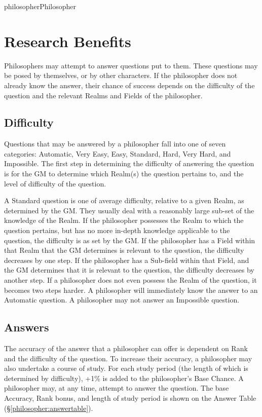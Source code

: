 \begin{Skill}[2.0]{philosopher}{Philosopher}
\section{Research Benefits}

Philosophers may attempt to answer questions put to them.  These
questions may be posed by themselves, or by other characters.  If the
philosopher does not already know the answer, their chance of success
depends on the difficulty of the question and the relevant Realms and
Fields of the philosopher.

\subsection{Difficulty}

Questions that may be answered by a philosopher fall into one of seven
categories: Automatic, Very Easy, Easy, Standard, Hard, Very Hard, and
Impossible.  The first step in determining the difficulty of answering
the question is for the GM to determine which Realm(s) the question
pertains to, and the level of difficulty of the question.

A Standard question is one of average difficulty, relative to a given
Realm, as determined by the GM.  They usually deal with a reasonably
large sub-set of the knowledge of the Realm.  If the philosopher
possesses the Realm to which the question pertains, but has no more
in-depth knowledge applicable to the question, the difficulty is as
set by the GM.  If the philosopher has a Field within that Realm that
the GM determines is relevant to the question, the difficulty
decreases by one step.  If the philosopher has a Sub-field within that
Field, and the GM determines that it is relevant to the question, the
difficulty decreases by another step.  If a philosopher does not even
possess the Realm of the question, it becomes two steps harder.  A
philosopher will immediately know the answer to an Automatic
question. A philosopher may not answer an Impossible question.

\subsection{Answers}

The accuracy of the answer that a philosopher can offer is dependent
on Rank and the difficulty of the question. To increase their
accuracy, a philosopher may also undertake a course of study.  For
each study period (the length of which is determined by difficulty),
+1\% is added to the philosopher’s Base Chance. A philosopher may, at
any time, attempt to answer the question.  The base Accuracy, Rank
bonus, and length of study period is shown on the Answer Table
(\S\ref{philosopher:answertable}).


\end{Skill}
